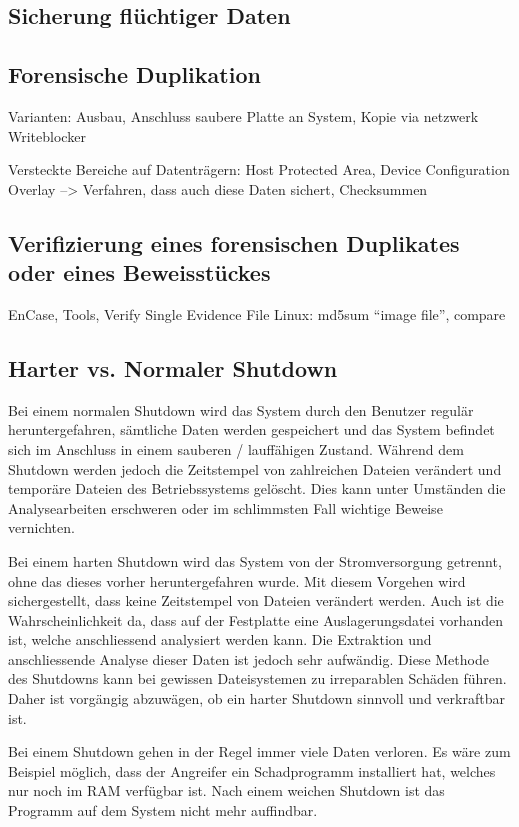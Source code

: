 \subsection{Sicherung flüchtiger Daten}


\subsection{Forensische Duplikation}
Varianten: Ausbau, Anschluss saubere Platte an System, Kopie via netzwerk
Writeblocker

Versteckte Bereiche auf Datenträgern: Host Protected Area, Device Configuration Overlay --> Verfahren, dass auch diese Daten sichert, Checksummen

\subsection{Verifizierung eines forensischen Duplikates oder eines Beweisstückes}
EnCase, Tools, Verify Single Evidence File
Linux: md5sum "`image file"', compare

\subsection{Harter vs. Normaler Shutdown}
Bei einem normalen Shutdown wird das System durch den Benutzer regulär heruntergefahren, sämtliche Daten werden gespeichert und das System befindet sich im Anschluss in einem sauberen / lauffähigen Zustand. Während dem Shutdown werden jedoch die Zeitstempel von zahlreichen Dateien verändert und temporäre Dateien des Betriebssystems gelöscht. Dies kann unter Umständen die Analysearbeiten erschweren oder im schlimmsten Fall wichtige Beweise vernichten. 

Bei einem harten Shutdown wird das System von der Stromversorgung getrennt, ohne das dieses vorher heruntergefahren wurde. Mit diesem Vorgehen wird sichergestellt, dass keine Zeitstempel von Dateien verändert werden. Auch ist die Wahrscheinlichkeit da, dass auf der Festplatte eine Auslagerungsdatei vorhanden ist, welche anschliessend analysiert werden kann. Die Extraktion und anschliessende Analyse dieser Daten ist jedoch sehr aufwändig. Diese Methode des Shutdowns kann bei gewissen Dateisystemen zu irreparablen Schäden führen. Daher ist vorgängig abzuwägen, ob ein harter Shutdown sinnvoll und verkraftbar ist.

Bei einem Shutdown gehen in der Regel immer viele Daten verloren. Es wäre zum Beispiel möglich, dass der Angreifer ein Schadprogramm installiert hat, welches nur noch im RAM verfügbar ist. Nach einem weichen Shutdown ist das Programm auf dem System nicht mehr auffindbar. 

